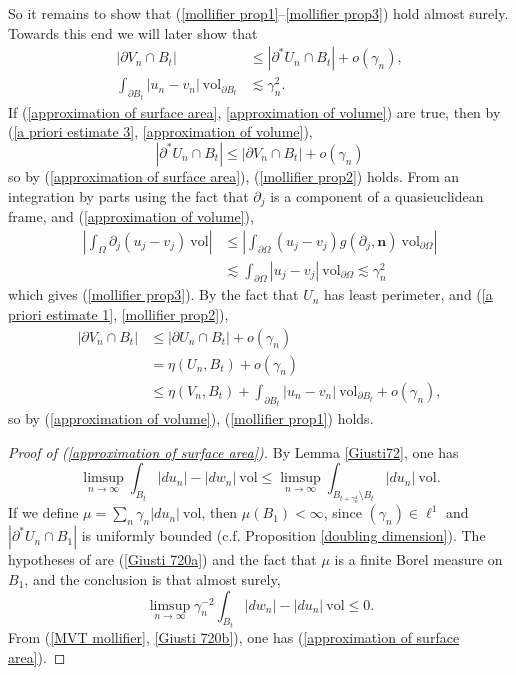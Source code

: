 \documentclass[reqno,12pt,letterpaper]{amsart}
\newcommand{\normal}{\mathbf n}
\newcommand{\vol}{\mathrm{vol}}
\theoremstyle{definition}
\numberwithin{equation}{section}
\begin{document}
So it remains to show that (\ref{mollifier prop1}--\ref{mollifier prop3}) hold almost surely.
Towards this end we will later show that
\begin{align}
|\partial V_n \cap B_t| &\leq |\partial^* U_n \cap B_t| + o(\gamma_n), \label{approximation of surface area} \\
\int_{\partial B_t} |u_n - v_n| ~\vol_{\partial B_t} &\lesssim \gamma_n^2. \label{approximation of volume}
\end{align}
If (\ref{approximation of surface area}, \ref{approximation of volume}) are true,
then by (\ref{a priori estimate 3}, \ref{approximation of volume}),
$$|\partial^* U_n \cap B_t| \leq |\partial V_n \cap B_t| + o(\gamma_n)$$
so by (\ref{approximation of surface area}), (\ref{mollifier prop2}) holds.
From an integration by parts using the fact that $\partial_j$ is a component of a quasieuclidean frame, and (\ref{approximation of volume}),
\begin{align*}
\left|\int_\Omega \partial_j(u_j - v_j) ~\vol\right|
&\leq \left|\int_{\partial \Omega} (u_j - v_j)g(\partial_j, \normal) ~\vol_{\partial \Omega}\right| \\
&\lesssim \int_{\partial \Omega} |u_j - v_j| ~\vol_{\partial \Omega} \lesssim \gamma_n^2
\end{align*}
which gives (\ref{mollifier prop3}).
By the fact that $U_n$ has least perimeter, and (\ref{a priori estimate 1}, \ref{mollifier prop2}),
\begin{align*}
|\partial V_n \cap B_t| &\leq |\partial U_n \cap B_t| + o(\gamma_n) \\
&= \eta(U_n, B_t) + o(\gamma_n)\\
&\leq \eta(V_n, B_t) + \int_{\partial B_t} |u_n - v_n| ~\vol_{\partial B_t} + o(\gamma_n),
\end{align*}
so by (\ref{approximation of volume}), (\ref{mollifier prop1}) holds.


\begin{proof}[Proof of (\ref{approximation of surface area})]
By Lemma \ref{Giusti72}, one has
\begin{equation}\label{Giusti 720a}
\limsup_{n \to \infty} \int_{B_t} |du_n| - |dw_n| ~\vol \leq \limsup_{n \to \infty} \int_{B_{t + \gamma_n^4} \setminus B_t} |du_n| ~\vol.
\end{equation}
If we define $\mu = \sum_n \gamma_n|du_n| ~\vol$, then $\mu(B_1) < \infty$, since $(\gamma_n) \in \ell^1$ and $|\partial^* U_n \cap B_1|$ is uniformly bounded (c.f. Proposition \ref{doubling dimension}).
The hypotheses of \cite[(7.20)]{Giusti77} are (\ref{Giusti 720a}) and the fact that $\mu$ is a finite Borel measure on $B_1$, and the conclusion is that almost surely,
\begin{equation}\label{Giusti 720b}
\limsup_{n \to \infty} \gamma_n^{-2} \int_{B_t} |dw_n| - |du_n| ~\vol \leq 0.
\end{equation}
From (\ref{MVT mollifier}, \ref{Giusti 720b}), one has (\ref{approximation of surface area}).
\end{proof}
\end{document}
